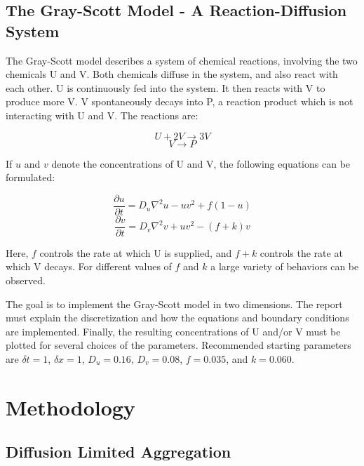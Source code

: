 \documentclass[10pt, journal]{IEEEtran}
\begin{document}
\subsection{The Gray-Scott Model - A Reaction-Diffusion System}

The Gray-Scott model describes a system of chemical reactions, involving the two chemicals U and V. Both chemicals diffuse in the system, and also react with each other. U is continuously fed into the system. It then reacts with V to produce more V. V spontaneously decays into P, a reaction product which is not interacting with U and V. The reactions are:

\begin{equation}
U+2V\rightarrow3V
\end{equation}
\begin{equation}
V\rightarrow P
\end{equation}

If $u$ and $v$ denote the concentrations of U and V, the following equations can be formulated:

\begin{equation}
\frac{\partial u}{\partial t}=D_{u}\nabla^{2}u-uv^{2}+f(1-u)
\end{equation}
\begin{equation}
\frac{\partial v}{\partial t}=D_{v}\nabla^{2}v+uv^{2}-(f+k)v
\end{equation}

Here, $f$ controls the rate at which U is supplied, and $f+k$ controls the rate at which V decays. For different values of $f$ and $k$ a large variety of behaviors can be observed. 

The goal is to implement the Gray-Scott model in two dimensions. The report must explain the discretization and how the equations and boundary conditions are implemented. Finally, the resulting concentrations of U and/or V must be plotted for several choices of the parameters. Recommended starting parameters are $\delta t=1$, $\delta x=1$, $D_{u}=0.16$, $D_{v}=0.08$, $f=0.035$, and $k=0.060$.

\section{Methodology}

\subsection{Diffusion Limited Aggregation}
\end{document}
